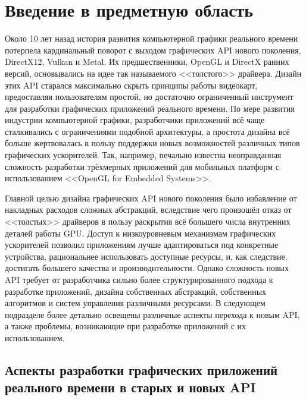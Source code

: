 \section{Введение в предметную область}
Около 10 лет назад история развития компьютерной графики реального времени потерпела кардинальный поворот с выходом графических API нового поколения, DirectX12, Vulkan и Metal.
Их предшественники, OpenGL и DirectX ранних версий, основывались на идее так называемого <<толстого>> драйвера.
Дизайн этих API старался максимально скрыть принципы работы видеокарт, предоставляя пользователям простой, но достаточно ограниченный инструмент для разработки графических приложений реального времени.
По мере развития индустрии компьютерной графики, разработчики приложений всё чаще сталкивались с ограничениями подобной архитектуры, а простота дизайна всё больше жертвовалась в пользу поддержки новых возможностей различных типов графических ускорителей.
Так, например, печально известна неоправданная сложность разработки трёхмерных приложений для мобильных платформ с использованием <<OpenGL for Embedded Systems>>.

Главной целью дизайна графических API нового поколения было избавление от накладных расходов сложных абстракций, вследствие чего произошёл отказ от <<толстых>> драйверов в пользу раскрытия всё большего числа внутренних деталей работы GPU.
Доступ к низкоуровневым механизмам графических ускорителей позволил приложениям лучше адаптироваться под конкретные устройства, рациональнее использовать доступные ресурсы, и, как следствие, достигать большего качества и производительности.
Однако сложность новых API требует от разработчика сильно более структурированного подхода к разработке приложений, дизайна собственных абстракций, собственных алгоритмов и систем управления различными ресурсами.
В следующем подразделе более детально освещены различные аспекты перехода к новым API, а также проблемы, возникающие при разработке приложений с их использованием.

\subsection{Аспекты разработки графических приложений реального времени в старых и новых API}
